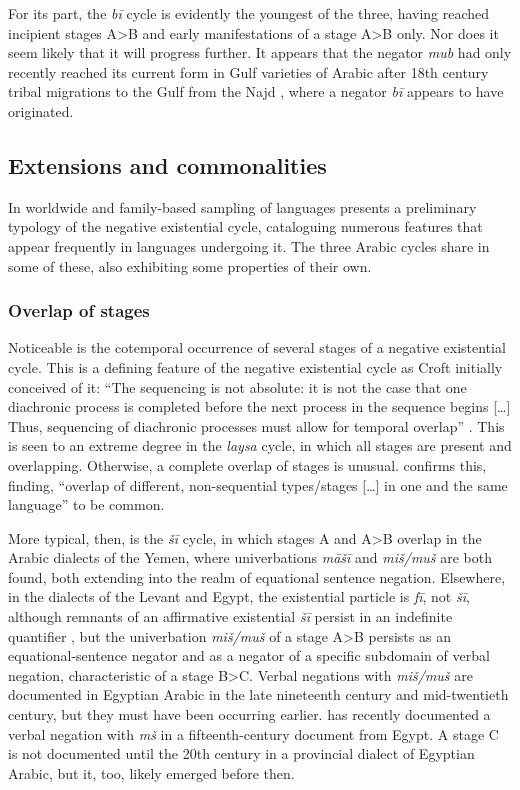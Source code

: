 \documentclass[output=paper,colorlinks,citecolor=brown]{langscibook}
\begin{document}
For its part, the \textit{bī} cycle is evidently the youngest of the three, having reached incipient stages A>B and early manifestations of a stage A>B only. Nor does it seem likely that it will progress further. It appears that the negator \textit{mub} had only recently reached its current form in Gulf varieties of Arabic after 18th century tribal migrations to the Gulf from the Najd \citep[28--30]{holes2006a}, where a negator \textit{bī} appears to have originated.

\subsection{Extensions and commonalities} \label{s:WiAR-5.1}

In worldwide and family-based sampling of languages \citet{Veselinova2016} presents a preliminary typology of the negative existential cycle, cataloguing numerous features that appear frequently in languages undergoing it. The three Arabic cycles share in some of these, also exhibiting some properties of their own. 

\subsubsection{Overlap of stages} \label{s:WiAR-5.1.1}

Noticeable is the cotemporal occurrence of several stages of a negative existential cycle. This is a defining feature of the negative existential cycle as Croft initially conceived of it: “The sequencing is not absolute: it is not the case that one diachronic process is completed before the next process in the sequence begins [\dots] Thus, sequencing of diachronic processes must allow for temporal overlap” \citep[22]{Croft1991}. This is seen to an extreme degree in the \textit{laysa} cycle, in which all stages are present and overlapping. Otherwise, a complete overlap of stages is unusual. \citet[151–154 and passim]{Veselinova2016} confirms this, finding, “overlap of different, non-sequential types/stages [\dots] in one and the same language” \citeyearpar[154, emphasis added]{Veselinova2016} to be common. 

More typical, then, is the \textit{šī} cycle, in which stages A and A>B overlap in the Arabic dialects of the Yemen, where univerbations \textit{māšī} and \textit{miš/muš} are both found, both extending into the realm of equational sentence negation. Elsewhere, in the dialects of the Levant and Egypt, the existential particle is \textit{fī}, not \textit{šī}, although remnants of an affirmative existential \textit{šī} persist in an indefinite quantifier \citep{wilmsen2017a}, but the univerbation \textit{miš/muš} of a stage A>B persists as an equational-sentence negator and as a negator of a specific subdomain of verbal negation, characteristic of a stage B>C. Verbal negations with \textit{miš/muš} are documented in Egyptian Arabic in the late nineteenth century and mid-twentieth century, but they must have been occurring earlier. \citet[158]{wagner2010a} has recently documented a verbal negation with \textit{mš} in a fifteenth-century document from Egypt. A stage C is not documented until the 20th century in a provincial dialect of Egyptian Arabic, but it, too, likely emerged before then.
\end{document}
